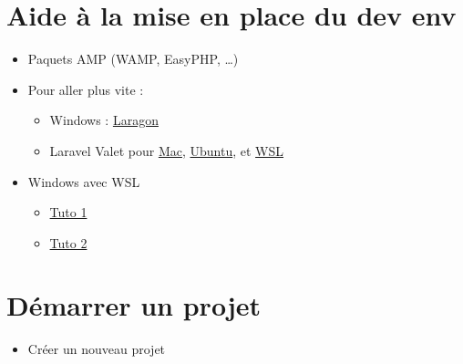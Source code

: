 \hypertarget{aide-uxe0-la-mise-en-place-du-dev-env}{%
\section{Aide à la mise en place du dev
env}\label{aide-uxe0-la-mise-en-place-du-dev-env}}

\begin{itemize}
\tightlist
\item
  Paquets AMP (WAMP, EasyPHP, \ldots)
\item
  Pour aller plus vite :

  \begin{itemize}
  \tightlist
  \item
    Windows : \href{https://laragon.org/}{Laragon}
  \item
    Laravel Valet pour
    \href{https://laravel.com/docs/master/valet}{Mac},
    \href{https://cpriego.github.io/valet-linux/\#installation}{Ubuntu},
    et \href{https://github.com/valeryan/valet-wsl}{WSL}
  \end{itemize}
\item
  Windows avec WSL

  \begin{itemize}
  \tightlist
  \item
    \href{https://jackwhiting.co.uk/posts/setting-up-a-windows-10-development-environment-with-wsl-php-laravel/}{Tuto
    1}
  \item
    \href{https://dev-squared.com/2018/05/15/getting-started-with-laravel-development-on-windows-subsystem-for-linux-with-vs-code-a-complete-guide/}{Tuto
    2}
  \end{itemize}
\end{itemize}

\hypertarget{duxe9marrer-un-projet}{%
\section{Démarrer un projet}\label{duxe9marrer-un-projet}}

\begin{itemize}
\tightlist
\item
  Créer un nouveau projet
\end{itemize}

\begin{english}

\begin{Shaded}
\begin{Highlighting}[]
\NormalTok{$ }
\NormalTok{$ }
\NormalTok{$ }
\end{Highlighting}
\end{Shaded}

\end{english}


